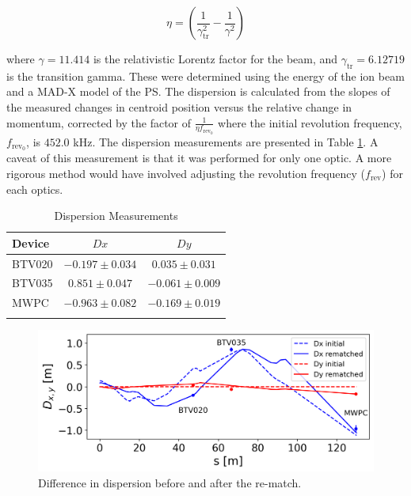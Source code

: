 \documentclass[a4paper,
               biblatex,     %
               ]{jacow}
\begin{document}
\begin{equation}
\eta = \left(\frac{1}{\gamma_{\text{tr}}^{2}} - \frac{1}{\gamma^{2}}\right)
\end{equation}

where $\gamma = 11.414$ is the relativistic Lorentz factor for the beam, and $\gamma_{\text{tr}} = 6.12719$ is the transition gamma. These were determined using the energy of the ion beam and a MAD-X \cite{noauthor_mad_nodate} model of the PS. The dispersion is calculated from the slopes of the measured changes in centroid position versus the relative change in momentum, corrected by the factor of $\frac{1}{\eta f_{\text{rev}_0}}$ where the initial revolution frequency, $f_{\text{rev}_0}$, is $452.0$ kHz. The dispersion measurements are presented in Table \ref{tab:dispersion}. A caveat of this measurement is that it was performed for only one optic. A more rigorous method would have involved adjusting the revolution frequency ($f_{\text{rev}}$) for each optics.

\begin{table}[h!]
\centering
\caption{Dispersion Measurements}
\begin{tabular}{l c c}
\hline
Device & \(Dx\) & \(Dy\) \\
\hline
BTV020  & \(-0.197 \pm 0.034\) & \(0.035 \pm 0.031\) \\
BTV035  & \(0.851 \pm 0.047\) & \(-0.061 \pm 0.009\) \\
MWPC   & \(-0.963 \pm 0.082\) & \(-0.169 \pm 0.019\) \\
\hline
\label{tab:dispersion}
\end{tabular}
\end{table}

\begin{figure}[!htb]
   \centering
   \includegraphics*[width=1.0\columnwidth]{THPR032_f1.png}
   \caption{Difference in dispersion before and after the re-match.}
   \label{fig:dispersion}
\end{figure}
\end{document}
